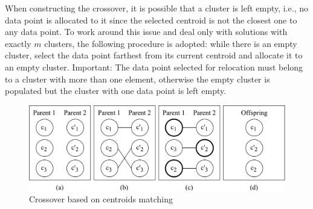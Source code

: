 When constructing the crossover, it is possible that a cluster is left empty, i.e., no data point is allocated to it since the selected centroid is not the closest one to any data point. To work around this issue and deal only with solutions with exactly $m$ clusters, the following procedure is adopted: while there is an empty cluster, select the data point farthest from its current centroid and allocate it to an empty cluster. Important: The data point selected for relocation must belong to a cluster with more than one element, otherwise the empty cluster is populated but the cluster with one data point is left empty.

\begin{figure}[H]
  \begin{center}
    \includegraphics[width=1.0\textwidth]{img/crossover}
    \caption{Crossover based on centroids matching}\label{fig:crossover}
  \end{center}
\end{figure}




